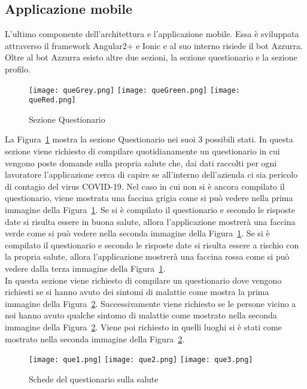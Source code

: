 \begin{trivlist}
	\item\subsection{Applicazione mobile}
	L'ultimo componente dell'architettura e l'applicazione mobile. Essa è sviluppata attraverso il framework Angular2+ e Ionic e al suo interno risiede il \gls{bot}\ap{[g]} Azzurra. Oltre al \gls{bot}\ap{[g]} Azzurra esisto altre due sezioni, la sezione questionario e la sezione profilo. 
	
	\begin{figure}[h]
		\centering
		\texttt{[image: queGrey.png]}\hfill
		\texttt{[image: queGreen.png]}\hfill
		\texttt{[image: queRed.png]}
		\caption{Sezione Questionario}\label{fig:que}
	\end{figure}
	
	La Figura~\ref{fig:que} mostra la sezione Questionario nei suoi 3 possibili stati. In questa sezione viene richiesto di compilare quotidianamente un questionario in cui vengono poste domande sulla propria salute che, dai dati raccolti per ogni lavoratore l'applicazione cerca di capire se all'interno dell'azienda ci sia pericolo di contagio del virus COVID-19. Nel caso in cui non si è ancora compilato il questionario, viene mostrata una faccina grigia come si può vedere nella prima immagine della Figura~\ref{fig:que}. Se si è compilato il questionario e secondo le risposte date si risulta essere in buona salute, allora l'applicazione mostrerà una faccina verde come si può vedere nella seconda immagine della Figura~\ref{fig:que}. Se si è compilato il questionario e secondo le risposte date si risulta essere a rischio con la propria salute, allora l'applicazione mostrerà una faccina rossa come si può vedere dalla terza immagine della Figura~\ref{fig:que}.
	\\
	\clearpage
	In questa sezione viene richiesto di compilare un questionario dove vengono richiesti se si hanno avuto dei sintomi di malattie come mostra la prima immagine della Figura~\ref{fig:queSlide}. Successivamente viene richiesto se le persone vicino a noi hanno avuto qualche sintomo di malattie come mostrato nella seconda immagine della Figura~\ref{fig:queSlide}. Viene poi richiesto in quelli luoghi si è stati come mostrato nella seconda immagine della Figura~\ref{fig:queSlide}.
	\begin{figure}[h]
		\begin{center}
			\texttt{[image: que1.png]}\hfill
			\texttt{[image: que2.png]}\hfill
			\texttt{[image: que3.png]}
			\caption{Schede del questionario sulla salute}\label{fig:queSlide}
		\end{center}
	\end{figure}


\end{trivlist}
